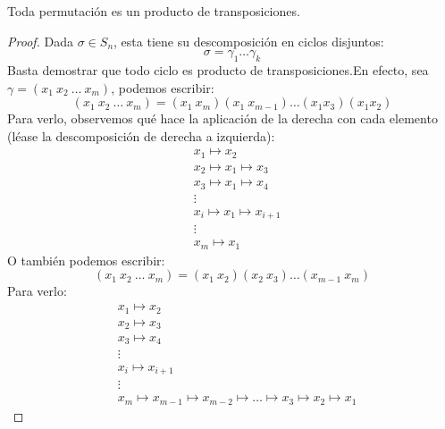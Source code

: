 \begin{prop}\label{prop:perm_prod_transp}
    Toda permutación es un producto de transposiciones.
    \begin{proof}
        Dada $\sigma\in S_n$, esta tiene su descomposición en ciclos disjuntos:
        \begin{equation*}
            \sigma = \gamma_1\ldots\gamma_k
        \end{equation*}
        Basta demostrar que todo ciclo es producto de transposiciones.\newline En efecto, sea $\gamma = (x_1\ x_2\ \ldots\ x_m)$, podemos escribir:
        \begin{equation*}
            (x_1\ x_2\ \ldots\ x_m) = (x_1\ x_m)(x_1\ x_{m-1}) \ldots (x_1 x_3)(x_1 x_2)
        \end{equation*}
        Para verlo, observemos qué hace la aplicación de la derecha con cada elemento (léase la descomposición de derecha a izquierda):
        \begin{align*}
            &x_1 \longmapsto x_2 \\
            &x_2 \longmapsto x_1 \longmapsto x_3 \\
            &x_3 \longmapsto x_1 \longmapsto x_4 \\
            &\vdots \\
            &x_i \longmapsto x_1 \longmapsto x_{i+1} \\
            &\vdots \\
            &x_m \longmapsto x_1
        \end{align*}
        O también podemos escribir:
        \begin{equation*}
            (x_1\ x_2\ \ldots\ x_m) = (x_1\ x_2)(x_2\ x_3) \ldots (x_{m-1}\ x_m)
        \end{equation*}
        Para verlo:
        \begin{align*}
            &x_1 \longmapsto x_2 \\
            &x_2 \longmapsto x_3 \\
            &x_3 \longmapsto x_4 \\
            &\vdots \\
            &x_i \longmapsto x_{i+1} \\
            &\vdots \\
            &x_m \longmapsto x_{m-1} \longmapsto x_{m-2} \longmapsto \ldots \longmapsto x_3 \longmapsto x_2 \longmapsto x_1
        \end{align*}
    \end{proof}
\end{prop}

